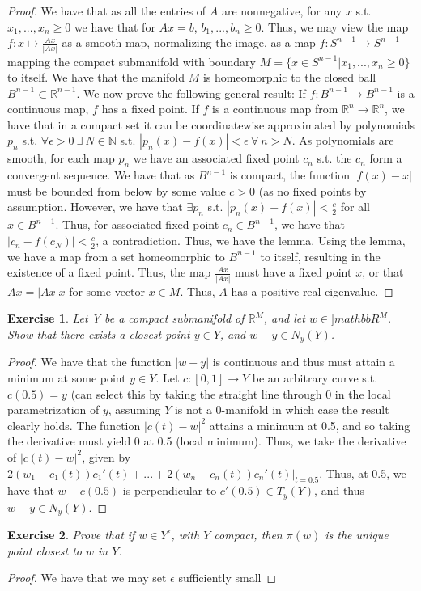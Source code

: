 \documentclass{article}
\newtheorem{exercise}{Exercise}
\begin{document}
  \begin{proof}
    We have that as all the entries of $A$ are nonnegative, for any $x$ s.t. $x_{1},...,x_{n} \geq 0$ we have that for $Ax = b$, $b_{1},...,b_{n} \geq 0$. Thus, we may view the map $f: x \mapsto \frac{Ax}{|Ax|}$ as a smooth map, normalizing the image, as a map $f:S^{n-1} \to S^{n-1}$ mapping the compact submanifold with boundary $M = \{x \in S^{n-1} | x_{1},...,x_{n} \geq 0\}$ to itself. We have that the manifold $M$ is homeomorphic to the closed ball $B^{n-1} \subset \mathbb{R}^{n-1}$. We now prove the following general result: If $f:B^{n-1} \to B^{n-1}$ is a continuous map, $f$ has a fixed point. \newline
    If $f$ is a continuous map from $\mathbb{R}^{n} \to \mathbb{R}^{n}$, we have that in a compact set it can be coordinatewise approximated by polynomials $p_{n}$ s.t. $\forall \epsilon > 0 \ \exists \ N \in \mathbb{N}$ s.t. $|p_{n}(x) - f(x)| < \epsilon \ \forall \ n > N$. As polynomials are smooth, for each map $p_{n}$ we have an associated fixed point $c_{n}$ s.t. the $c_{n}$ form a convergent sequence. We have that as $B^{n-1}$ is compact, the function $|f(x) - x|$ must be bounded from below by some value $c > 0$ (as no fixed points by assumption. However, we have that $\exists p_{n}$ s.t. $|p_{n}(x) - f(x)| < \frac{c}{2}$ for all $x \in B^{n-1}$. Thus, for associated fixed point $c_{n} \in B^{n-1}$, we have that $|c_{n} - f(c_{N})| < \frac{c}{2}$, a contradiction. Thus, we have the lemma.
    Using the lemma, we have a map from a set homeomorphic to $B^{n-1}$ to itself, resulting in the existence of a fixed point. Thus, the map $\frac{Ax}{|Ax|}$ must have a fixed point $x$, or that $Ax = |Ax|x$ for some vector $x \in M$. Thus, $A$ has a positive real eigenvalue. 
  \end{proof}

  \begin{exercise}
    Let Y be a compact submanifold of $\mathbb{R}^{M}$, and let $w \in ]mathbb{R}^{M}$. Show that there exists a closest point $y \in Y$, and $w-y \in N_{y}(Y)$.
    \end{exercise}
    \begin{proof}
      We have that the function $|w-y|$ is continuous and thus must attain a minimum at some point $y \in Y$. Let $c: [0,1] \to Y$ be an arbitrary curve s.t. $c(0.5) = y$ (can select this by taking the straight line through 0 in the local parametrization of $y$, assuming $Y$ is not a 0-manifold in which case the result clearly holds. The function $|c(t) - w|^{2}$ attains a minimum at 0.5, and so taking the derivative must yield 0 at 0.5 (local minimum). Thus, we take the derivative of $|c(t) - w|^{2}$, given by $2(w_{1}-c_{1}(t))c_{1}'(t) + ... + 2(w_{n}-c_{n}(t))c_{n}'(t)\big|_{t = 0.5}$. Thus, at 0.5, we have that $w - c(0.5)$ is perpendicular to $c'(0.5) \in T_{y}(Y)$, and thus $w-y \in N_{y}(Y)$.  
    \end{proof}

    \begin{exercise}
      Prove that if $w \in Y^{\epsilon}$, with $Y$ compact, then $\pi(w)$ is the unique point closest to $w$ in $Y$. 
    \end{exercise}
    \begin{proof}
      We have that we may set $\epsilon$ sufficiently small 
      \end{proof}
\end{document}
